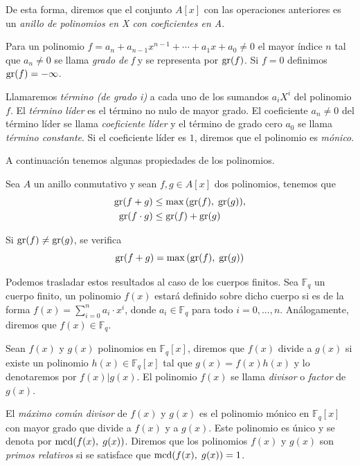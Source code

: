 De esta forma, diremos que el conjunto $A[x]$ con las operaciones anteriores es un \emph{anillo de polinomios en X con coeficientes en A}.

\begin{definition}
    Para un polinomio $f = a_n + a_{n-1} x^{n-1} + \cdots + a_1 x + a_0 \neq 0$ el mayor índice $n$ tal que $a_n \neq 0$ se llama \emph{grado de f} y se representa por $\operatorname{gr}(f)$. Si $f = 0$ definimos $\operatorname{gr}(f) = - \infty$.

    Llamaremos \emph{término (de grado i)} a cada uno de los sumandos $a_i X^i$ del polinomio $f$. El \emph{término líder} es el término no nulo de mayor grado. El coeficiente $a_n \neq 0$ del término líder se llama \emph{coeficiente líder} y el término de grado cero $a_0$ se llama \emph{término constante}. Si el coeficiente líder es $1$, diremos que el polinomio es \emph{mónico}.
\end{definition}

A continuación tenemos algunas propiedades de los polinomios.

\begin{proposition}
    Sea $A$ un anillo conmutativo y sean $f,g \in A[x]$ dos polinomios, tenemos que 
    \begin{align*}
        \operatorname{gr}(f + g) &\leq \max{(\operatorname{gr}(f), \; \operatorname{gr}(g))},\\
        \operatorname{gr}(f \cdot g) &\leq \operatorname{gr}(f) + \operatorname{gr}(g)
    \end{align*}

    Si $\operatorname{gr}(f) \neq \operatorname{gr}(g)$, se verifica
    \[
        \operatorname{gr}(f + g) = \max{(\operatorname{gr}(f), \; \operatorname{gr}(g))}
    \]
\end{proposition}

Podemos trasladar estos resultados al caso de los cuerpos finitos. Sea $\mathbb{F}_q$ un cuerpo finito, un polinomio $f(x)$ estará definido sobre dicho cuerpo si es de la forma $f(x) = \sum_{i = 0}^{n} a_i \cdot x^i$, donde $a_i \in \mathbb{F}_q$ para todo $i = 0, ..., n$. Análogamente, diremos que $f(x) \in \mathbb{F}_q$.

Sean $f(x)$ y $g(x)$ polinomios en $\mathbb{F}_q[x]$, diremos que $f(x)$ divide a $g(x)$ si existe un polinomio $h(x) \in \mathbb{F}_q[x]$ tal que $g(x) = f(x) h(x)$ y lo denotaremos por $f(x) \vert g(x)$. El polinomio $f(x)$ se llama \emph{divisor} o \emph{factor} de $g(x)$.

El \emph{máximo común divisor} de $f(x)$ y $g(x)$ es el polinomio mónico en $\mathbb{F}_q[x]$ con mayor grado que divide a $f(x)$ y a $g(x)$. Este polinomio es único y se denota por $\operatorname{mcd}(f(x), \; g(x))$. Diremos que los polinomios $f(x)$ y $g(x)$ son \emph{primos relativos} si se satisface que $\operatorname{mcd}(f(x), \; g(x)) = 1$.

